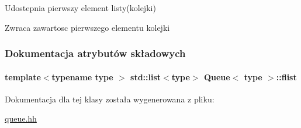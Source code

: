 Udostepnia pierwszy element listy(kolejki) 

\begin{DoxyReturn}{Zwraca}
zawartosc pierwszego elementu kolejki 
\end{DoxyReturn}


\subsubsection{Dokumentacja atrybutów składowych}
\hypertarget{class_queue_ad3cd7911bfc506abd763885641a78f91}{
\paragraph[{flist}]{\setlength{\rightskip}{0pt plus 5cm}template$<$typename type $>$ std\-::list$<$type$>$ {\bf Queue}$<$ type $>$\-::flist\hspace{0.3cm}{\ttfamily [private]}}}\label{class_queue_ad3cd7911bfc506abd763885641a78f91}


Dokumentacja dla tej klasy została wygenerowana z pliku\-:\begin{DoxyCompactItemize}
\item 
\hyperlink{queue_8hh}{queue.\-hh}\end{DoxyCompactItemize}
